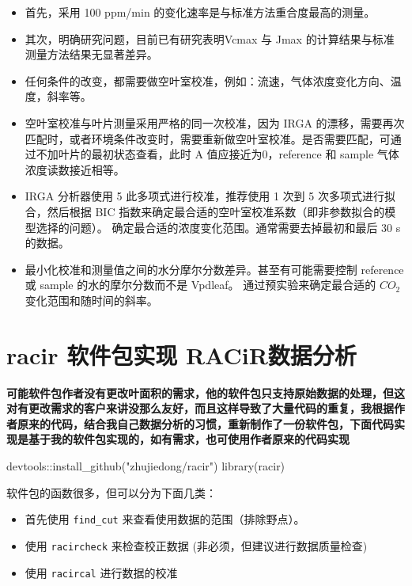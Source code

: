 \documentclass[
]{krantz}
\makeatletter
\newenvironment{Shaded}{\begin{snugshade}}{\end{snugshade}}
\newcommand{\FunctionTok}[1]{\textcolor[rgb]{0.00,0.00,0.00}{#1}}
\newcommand{\NormalTok}[1]{#1}
\newcommand{\SpecialCharTok}[1]{\textcolor[rgb]{0.00,0.00,0.00}{#1}}
\newcommand{\StringTok}[1]{\textcolor[rgb]{0.31,0.60,0.02}{#1}}
\providecommand{\tightlist}{%
  \setlength{\itemsep}{0pt}\setlength{\parskip}{0pt}}
\newenvironment{kframe}{%
\medskip{}
\setlength{\fboxsep}{.8em}
 \def\at@end@of@kframe{}%
 \ifinner\ifhmode%
  \def\at@end@of@kframe{\end{minipage}}%
  \begin{minipage}{\columnwidth}%
 \fi\fi%
 \def\FrameCommand##1{\hskip\@totalleftmargin \hskip-\fboxsep
 \colorbox{shadecolor}{##1}\hskip-\fboxsep
     \hskip-\linewidth \hskip-\@totalleftmargin \hskip\columnwidth}%
 \MakeFramed {\advance\hsize-\width
   \@totalleftmargin\z@ \linewidth\hsize
   \@setminipage}}%
 {\par\unskip\endMakeFramed%
 \at@end@of@kframe}
\renewenvironment{Shaded}{\begin{kframe}}{\end{kframe}}
\makeatother
\begin{document}
\begin{itemize}
\tightlist
\item
  首先，采用 100 ppm/min 的变化速率是与标准方法重合度最高的测量。
\item
  其次，明确研究问题，目前已有研究表明Vcmax 与 Jmax 的计算结果与标准测量方法结果无显著差异。
\item
  任何条件的改变，都需要做空叶室校准，例如：流速，气体浓度变化方向、温度，斜率等。
\item
  空叶室校准与叶片测量采用严格的同一次校准，因为 IRGA 的漂移，需要再次匹配时，或者环境条件改变时，需要重新做空叶室校准。是否需要匹配，可通过不加叶片的最初状态查看，此时 A 值应接近为0，reference 和 sample 气体浓度读数接近相等。
\item
  IRGA 分析器使用 5 此多项式进行校准，推荐使用 1 次到 5 次多项式进行拟合，然后根据 BIC 指数来确定最合适的空叶室校准系数（即非参数拟合的模型选择的问题）。
  确定最合适的浓度变化范围。通常需要去掉最初和最后 30 s的数据。
\item
  最小化校准和测量值之间的水分摩尔分数差异。甚至有可能需要控制 reference 或 sample 的水的摩尔分数而不是 Vpdleaf。
  通过预实验来确定最合适的 \(CO_2\) 变化范围和随时间的斜率。
\end{itemize}

\hypertarget{racir_pkg}{%
\section{\texorpdfstring{racir 软件包实现 RACiR\texttrademark 数据分析}{racir 软件包实现 RACiR数据分析}}\label{racir_pkg}}

\textbf{可能软件包作者没有更改叶面积的需求，他的软件包只支持原始数据的处理，但这对有更改需求的客户来讲没那么友好，而且这样导致了大量代码的重复，我根据作者原来的代码，结合我自己数据分析的习惯，重新制作了一份软件包，下面代码实现是基于我的软件包实现的，如有需求，也可使用作者原来的代码实现}

\begin{Shaded}
\begin{Highlighting}[]
\NormalTok{devtools}\SpecialCharTok{::}\FunctionTok{install\_github}\NormalTok{(}\StringTok{"zhujiedong/racir"}\NormalTok{)}
\FunctionTok{library}\NormalTok{(racir)}
\end{Highlighting}
\end{Shaded}

软件包的函数很多，但可以分为下面几类：

\begin{itemize}
\item
  首先使用 \texttt{find\_cut} 来查看使用数据的范围（排除野点）。
\item
  使用 \texttt{racircheck} 来检查校正数据 (非必须，但建议进行数据质量检查)
\item
  使用 \texttt{racircal} 进行数据的校准
\end{itemize}
\end{document}
